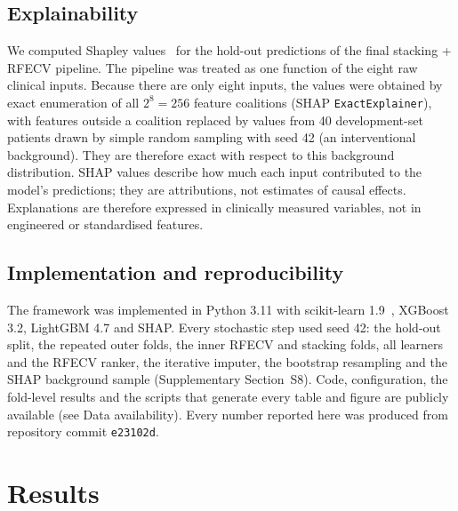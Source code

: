 \documentclass[preprint,12pt,authoryear=false]{elsarticle}
\begin{document}
\subsection{Explainability}
We computed Shapley values~\cite{lundberg2017shap} for the hold-out predictions of the final stacking + RFECV pipeline. The pipeline was treated as one function of the eight raw clinical inputs. Because there are only eight inputs, the values were obtained by exact enumeration of all $2^8 = 256$ feature coalitions (SHAP \texttt{ExactExplainer}), with features outside a coalition replaced by values from 40 development-set patients drawn by simple random sampling with seed 42 (an interventional background). They are therefore exact with respect to this background distribution. SHAP values describe how much each input contributed to the model's predictions; they are attributions, not estimates of causal effects. Explanations are therefore expressed in clinically measured variables, not in engineered or standardised features.

\subsection{Implementation and reproducibility}
The framework was implemented in Python 3.11 with scikit-learn 1.9~\cite{pedregosa2011sklearn}, XGBoost 3.2, LightGBM 4.7 and SHAP. Every stochastic step used seed 42: the hold-out split, the repeated outer folds, the inner RFECV and stacking folds, all learners and the RFECV ranker, the iterative imputer, the bootstrap resampling and the SHAP background sample (Supplementary Section~S8). Code, configuration, the fold-level results and the scripts that generate every table and figure are publicly available (see Data availability). Every number reported here was produced from repository commit \texttt{e23102d}.
\section{Results}
\label{sec:results}
\end{document}
